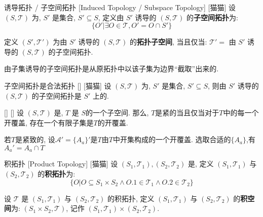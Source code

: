\documentclass[UTF8]{ctexart}
\begin{document}
            \begin{dfn}
                {诱导拓扑 / 子空间拓扑}
                [Induced Topology / Subspace Topology]
                [猫猫]
                设 \((S,\mathcal{T})\) 为, \(S'\) 是集合, \(S'\subseteq S\), 定义由 \(S'\) 诱导的 \((S,\mathcal{T})\) 的\textbf{子空间拓扑}为: 
                \[\{O'|\exists O\in\mathcal{T}, O'=O\cap S'\}\]

                定义 \((S',\mathcal{T}')\) 为由 \(S'\) 诱导的 \((S,\mathcal{T})\) 的\textbf{拓扑子空间}, 当且仅当: \(\mathcal{T}'=\) 由 \(S'\) 诱导的 \((S,\mathcal{T})\) 的子空间拓扑. 
            \end{dfn}

            \begin{rmk}
                [猫猫]
                由子集诱导的子空间拓扑是从原拓扑中以该子集为边界``截取''出来的. 
            \end{rmk}

            \begin{ppt}
                []
                {子空间拓扑是合法拓扑}
                []
                [猫猫]
                设 \((S,\mathcal{T})\) 为, \(S'\) 是集合, \(S'\subseteq S\), 则由 \(S'\) 诱导的 \((S,\mathcal{T})\) 的子空间拓扑是 \(S'\) 上的. 
            \end{ppt}

            \begin{ppt}
                []
                {}
                []
                []
                设 \((S,\mathcal{T})\) 是, \(T\) 是 \(S\)的一个子空间. 那么, \(T\)是紧的当且仅当对于\(T\)中的每一个开覆盖, 存在一个有限子集是\(T\)的开覆盖. 
            \end{ppt}
            
            \begin{prf}
                若\(T\)是紧致的, 设\(\mathcal{A}'=\{A_{a}\} '\)是\(T\)由\(T\)中开集构成的一个开覆盖. 选取合适的\(\{A_{a}\}\),有\(A_{a}'=A_{a}\cap T\)
            \end{prf}
            
            \begin{dfn}
                {积拓扑}
                [Product Topology]
                [猫猫]
                设 \((S_1, \mathcal{T}_1), (S_2, \mathcal{T}_2)\) 是, 定义 \((S_1, \mathcal{T}_1)\) 与 \((S_2, \mathcal{T}_2)\) 的\textbf{积拓扑}为: 
                \[\{O|O\subseteq S_1\times S_2\land O.1\in\mathcal{T}_1\land O.2\in\mathcal{T}_2\}\]

                设 \(\mathcal{T}\) 是 \((S_1, \mathcal{T}_1)\) 与 \((S_2, \mathcal{T}_2)\) 的积拓扑, 定义 \((S_1, \mathcal{T}_1)\) 与 \((S_2, \mathcal{T}_2)\) 的\textbf{积空间}为: \((S_1\times S_2, \mathcal{T})\), 记作 \((S_1, \mathcal{T}_1)\times(S_2, \mathcal{T}_2)\).
            \end{dfn}
\end{document}

